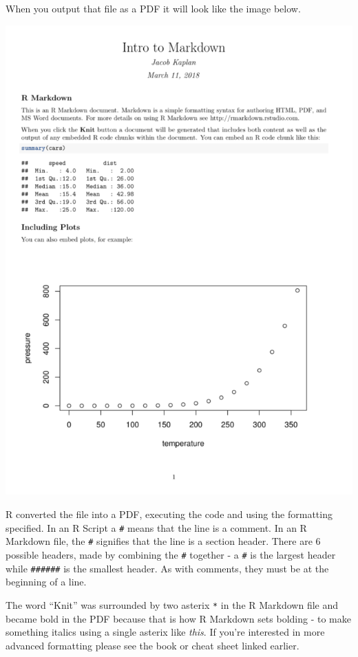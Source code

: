 \documentclass[
  12pt,
  openany]{book}
\begin{document}
When you output that file as a PDF it will look like the image below.

\includegraphics{images/markdown_output_example.PNG}

R converted the file into a PDF, executing the code and using the formatting specified. In an R Script a \texttt{\#} means that the line is a comment. In an R Markdown file, the \texttt{\#} signifies that the line is a section header. There are 6 possible headers, made by combining the \texttt{\#} together - a \texttt{\#} is the largest header while \texttt{\#\#\#\#\#\#} is the smallest header. As with comments, they must be at the beginning of a line.

The word ``Knit'' was surrounded by two asterix \texttt{*} in the R Markdown file and became bold in the PDF because that is how R Markdown sets bolding - to make something italics using a single asterix like \emph{this}. If you're interested in more advanced formatting please see the book or cheat sheet linked earlier.
\end{document}

